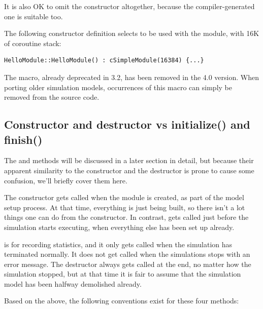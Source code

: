 It is also OK to omit the constructor altogether, because the
compiler-generated one is suitable too.

The following constructor definition selects  to be used
with the module, with 16K of coroutine stack:

\begin{verbatim}
HelloModule::HelloModule() : cSimpleModule(16384) {...}
\end{verbatim}

\begin{note}
    The  macro, already deprecated in {\opp} 3.2,
    has been removed in the 4.0 version. When porting older simulation models,
    occurrences of this macro can simply be removed from the source code.
\end{note}



\subsection{Constructor and destructor vs initialize() and finish()}

The  and  methods will be discussed
in a later section in detail, but because their apparent similarity
to the constructor and the destructor is prone to cause some confusion,
we'll briefly cover them here.

The constructor gets called when the module is created, as part of the
model setup process. At that time, everything is just being built,
so there isn't a lot things one can do from the constructor.
In contrast,  gets called just before the
simulation starts executing, when everything else has been set up
already.

 is for recording statistics, and it only gets called
when the simulation has terminated normally. It does not get called when
the simulations stops with an error message. The destructor always
gets called at the end, no matter how the simulation stopped, but
at that time it is fair to assume that the simulation model has been
halfway demolished already.

Based on the above, the following conventions exist for these four methods:

